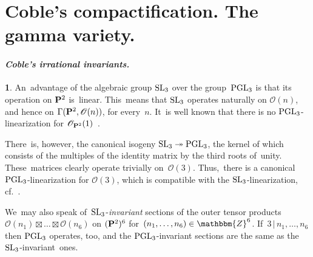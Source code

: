 \documentclass[reqno]{amsart}
\theoremstyle{definition}
\newtheorem{ttt}[theorem]{}
\theoremstyle{remark}
\numberwithin{equation}{section}
\newcommand{\calO}{\mathscr{O}}
\newcommand{\bbZ}{\mathbbm{Z}}
\newcommand{\SL}{\mathop{\rm SL}\nolimits}
\newcommand{\PGL}{\mathop{\rm PGL}\nolimits}
\newcommand{\bP}{{\bf P}}
\begin{document}
\section{Coble's compactification. The gamma variety.}

\paragraph{\it Coble's irrational invariants.}

\begin{ttt}\smallskip
An~advantage of the algebraic group
$\SL_3$
over the
group~$\PGL_3$
is that its operation on
$\bP^2$
is~linear. This~means that
$\SL_3$
operates naturally on
$\calO(n)$,
and hence on
$\Gamma(\bP^2, \calO(n))$,
for
every~$n$.
It~is well known that there is no
\mbox{$\PGL_3$-linearization}
for
$\calO_{\bP^2}(1)$~\cite[Chapter~1, \S3]{MFK}.

There~is, however, the canonical isogeny
$\SL_3 \twoheadrightarrow \PGL_3$,
the kernel of which consists of the multiples of the identity matrix by the third roots of~unity. These~matrices clearly operate trivially
on~$\calO(3)$.
Thus,~there is a canonical
\mbox{$\PGL_3$-linearization}
for
$\calO(3)$,
which is compatible with the
\mbox{$\SL_3$-linearization}, cf.~\cite[Chapter~3, \S1]{MFK}.

We~may also speak
of~\mbox{$\SL_3$-{\em invariant\/}}
sections of the outer tensor products
$\calO(n_1) \boxtimes \ldots \boxtimes \calO(n_6)$
on
$(\bP^2)^6$
for~$(n_1, \ldots, n_6) \in \bbZ^6$.
If~$3 \,|\, n_1, \ldots, n_6$
then
$\PGL_3$
operates, too, and the
\mbox{$\PGL_3$-invariant}
sections are the same as the
\mbox{$\SL_3$-invariant}~ones.
\end{ttt}
\end{document}
